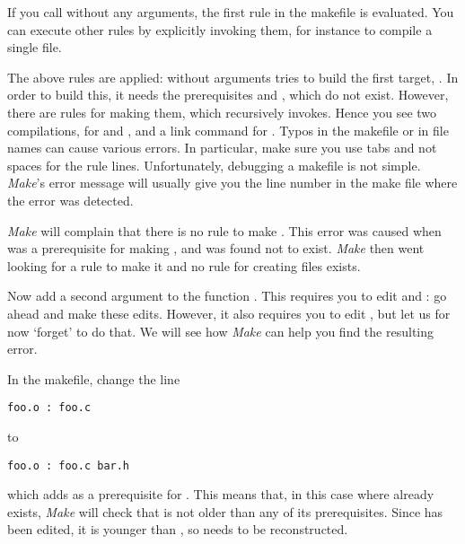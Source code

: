 If you call  without any arguments,
the first rule in the makefile is evaluated. You can execute other
rules by explicitly invoking them, for instance  to
compile a single file.

  {The above rules are applied:  without arguments tries to
    build the first target, . In order to build this, it
    needs the prerequisites  and , which do not
    exist. However, there are rules for making them, which 
    recursively invokes. Hence you see two compilations, for 
    and , and a link command for .}
  {Typos in the makefile or in file names can cause various
    errors. In particular, make sure you use tabs and not spaces for
    the rule lines. Unfortunately, debugging a makefile is not simple. 
    \emph{Make}'s error message will usually give 
    you the line number in the make file where the error was detected.}

  {\emph{Make} will complain that there is no rule to make
    . This error was caused when  was a
    prerequisite for making , and was found not to exist. 
    \emph{Make} then went
    looking for a rule to make it and no rule for creating 
    files exists.}{}

Now add a second argument to the function . This requires you
to edit  and : go ahead and make these
edits. However, it also requires you to edit , but let us for
now `forget' to do that. We will see how \emph{Make} can help you find
the resulting error.


In the makefile, change the line
\begin{verbatim}
foo.o : foo.c
\end{verbatim}
to
\begin{verbatim}
foo.o : foo.c bar.h
\end{verbatim}
which adds  as a prerequisite for . This means that,
in this case where  already exists, \emph{Make} will check
that  is not older than any of its prerequisites. Since
 has been edited, it is younger than , so 
needs to be reconstructed.

